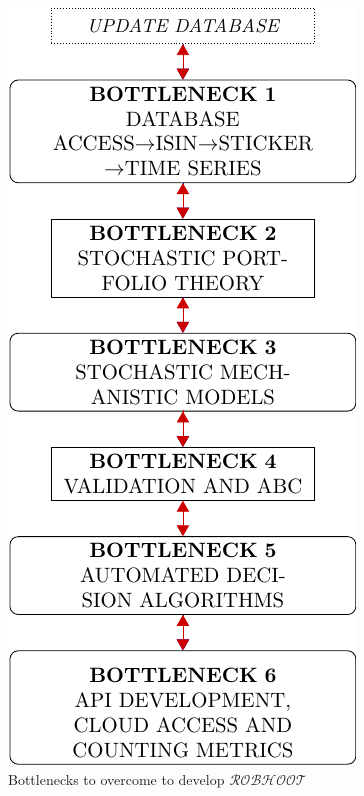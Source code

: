 \documentclass[english,12pt]{article}
\begin{document}
\begin{figure}
\vspace{-1 in}
\begin{center}
\includegraphics[scale=1.25]{EasyFlowChartBottlenecks.pdf}
\end{center}
\caption{Bottlenecks to overcome to develop $\mathcal{ROBHOOT}$}
\end{figure}
\newpage


\printindex
\end{document}
